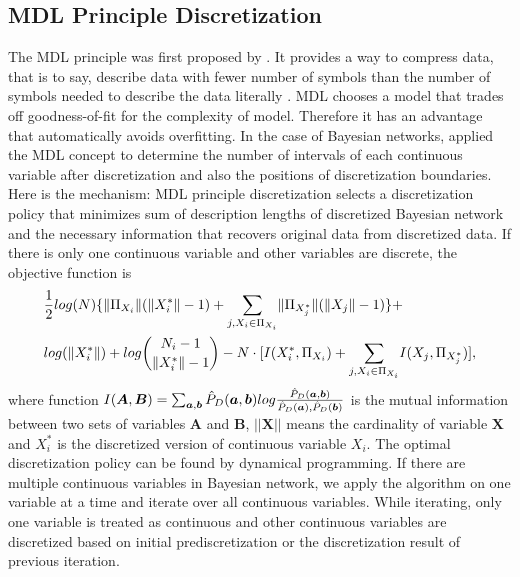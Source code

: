 \subsection{MDL Principle Discretization}
\label{MDL}
The MDL principle was first proposed by \cite{MDL_1978}. It provides a way to compress data, that is to say, describe data with fewer number of symbols than the number of symbols needed to describe the data literally \citep{Grunwald_2009}. MDL chooses a model that trades off goodness-of-fit for the complexity of model. Therefore it has an advantage that automatically avoids overfitting. In the case of Bayesian networks, \citep{Friedman_1996} applied the MDL concept to determine the number of intervals of each continuous variable after discretization and also the positions of discretization boundaries. Here is the mechanism: MDL principle discretization selects a discretization policy that minimizes sum of description lengths of discretized Bayesian network and the necessary information that recovers original data from discretized data. If there is only one continuous variable and other variables are discrete, the objective function is  
\begin{equation}
\begin{aligned}
&{1 \over 2} log(N) \{  \lVert \Pi_{X_i} \rVert (\lVert X^*_i \rVert - 1) +
 {\sum_{j,X_i \in \Pi_{X_i}}} \lVert \Pi_{X^*_j} \rVert (\lVert X_j \rVert - 1) \} + \\
& log(\lVert {X^*_i} \rVert) + log{{N_{i}-1}\choose{\lVert {X^*_i} \rVert -1}}  -N \cdot [I(X^*_i,\Pi_{X_i}) + {\sum_{j,X_i \in \Pi_{X_i}}} I(X_j, \Pi_{X^*_j})],
\end{aligned}
\end{equation}
where function $I(\boldsymbol{A},\boldsymbol{B}) = \sum_{\boldsymbol{a},\boldsymbol{b}} \hat{P}_D (\boldsymbol{a},\boldsymbol{b}) log {{\hat{P}_D (\boldsymbol{a},\boldsymbol{b})}\over{\hat{P}_D (\boldsymbol{a}),\hat{P}_D (\boldsymbol{b})}}$ is the mutual information between two sets of variables $\boldsymbol{A}$ and $\boldsymbol{B}$, $||\boldsymbol{X}||$ means the cardinality of variable $\boldsymbol{X}$ and $X^*_i$ is the discretized version of continuous variable $X_i$. The optimal discretization policy can be found by dynamical programming. If there are multiple continuous variables in Bayesian network, we apply the algorithm on one variable at a time and iterate over all continuous variables. While iterating, only one variable is treated as continuous and other continuous variables are discretized based on initial prediscretization or the discretization result of previous iteration.

